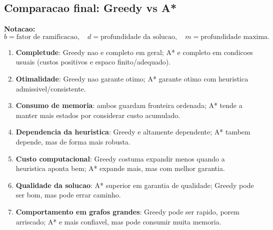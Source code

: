 \subsection{Comparacao final: Greedy vs A*}
\textbf{Notacao:}
\[
b = \text{fator de ramificacao},\quad d = \text{profundidade da solucao},\quad m = \text{profundidade maxima}.
\]

\begin{enumerate}[label=\alph*)]
  \item \textbf{Completude}: Greedy nao e completo em geral; A* e completo em condicoes usuais (custos positivos e espaco finito/adequado).
  \item \textbf{Otimalidade}: Greedy nao garante otimo; A* garante otimo com heuristica admissivel/consistente.
  \item \textbf{Consumo de memoria}: ambos guardam fronteira ordenada; A* tende a manter mais estados por considerar custo acumulado.
  \item \textbf{Dependencia da heuristica}: Greedy e altamente dependente; A* tambem depende, mas de forma mais robusta.
  \item \textbf{Custo computacional}: Greedy costuma expandir menos quando a heuristica aponta bem; A* expande mais, mas com melhor garantia.
  \item \textbf{Qualidade da solucao}: A* superior em garantia de qualidade; Greedy pode ser bom, mas pode errar caminho.
  \item \textbf{Comportamento em grafos grandes}: Greedy pode ser rapido, porem arriscado; A* e mais confiavel, mas pode consumir muita memoria.
\end{enumerate}
